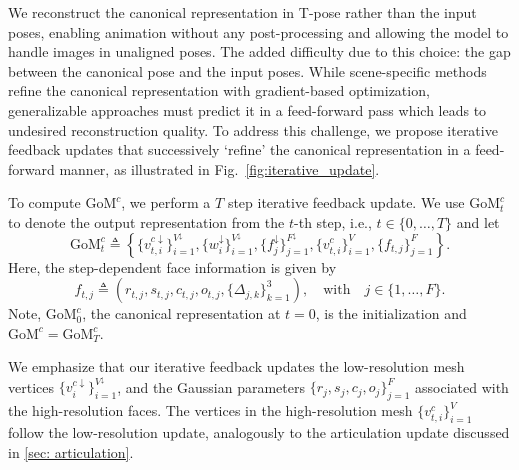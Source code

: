 We reconstruct the canonical representation in T-pose rather than the input poses, enabling animation without any post-processing and allowing the model to handle images in unaligned poses. %
The added difficulty due to this choice:  the gap between the canonical pose and the input poses. While scene-specific methods refine the canonical representation with gradient-based optimization, generalizable approaches must predict it in a feed-forward pass which leads to undesired reconstruction quality. To address this challenge, we propose iterative feedback updates that successively `refine' the canonical representation in a feed-forward manner, as illustrated in Fig.~\ref{fig:iterative_update}.

To compute 
$\text{GoM}^c$, we perform a $T$ step  iterative feedback update.
We use $\text{GoM}_t^c$ to denote the output representation from the $t$-th step, i.e., $t\in\{0, \dots, T\}$ and let 
\begin{equation}
    \text{GoM}_t^c \triangleq \left\{\{v_{t, i}^{c\downarrow}\}_{i=1}^{V^\downarrow}, \{w_{i}^\downarrow\}_{i=1}^{V^\downarrow}, \{f_{j}^\downarrow\}_{j=1}^{F^\downarrow}, \{v_{t, i}^c\}_{i=1}^V, \{f_{t, j}\}_{j=1}^{F}\right\}.
\end{equation}
Here, the step-dependent face information is given by 
\begin{equation}
    f_{t, j} \triangleq (r_{t, j}, s_{t, j}, c_{t, j}, o_{t, j}, \{\Delta_{j,k}\}_{k=1}^3), \quad\text{with}\quad j\in\{1, \dots, F\}.
\end{equation}
Note, $\text{GoM}_0^c$, the canonical representation at $t=0$, is the initialization and $\text{GoM}^c = \text{GoM}^c_T$. 

We emphasize that our iterative feedback updates  the low-resolution mesh vertices $\{v_i^{c\downarrow}\}_{i=1}^{V^\downarrow}$, and the Gaussian parameters $\{r_j, s_j, c_j, o_j\}_{j=1}^F$ associated with the high-resolution faces. The vertices in the high-resolution mesh $\{v_{t, i}^c\}_{i=1}^V$ follow the low-resolution update, analogously to the articulation update discussed in \cref{sec: articulation}. %


